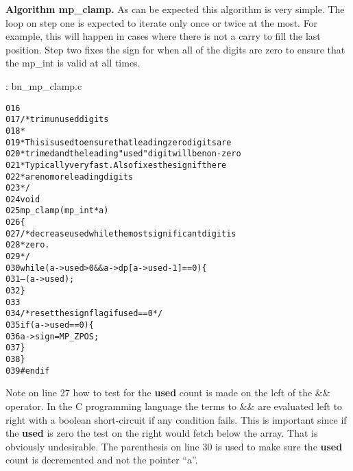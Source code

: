 \documentclass[b5paper]{book}
\begin{document}
\textbf{Algorithm mp\_clamp.}
As can be expected this algorithm is very simple.  The loop on step one is expected to iterate only once or twice at
the most.  For example, this will happen in cases where there is not a carry to fill the last position.  Step two fixes the sign for 
when all of the digits are zero to ensure that the mp\_int is valid at all times.

\vspace{+3mm}\begin{small}
\hspace{-5.1mm}{\bf File}: bn\_mp\_clamp.c
\vspace{-3mm}
\begin{alltt}
016   
017   /* trim unused digits 
018    *
019    * This is used to ensure that leading zero digits are
020    * trimed and the leading "used" digit will be non-zero
021    * Typically very fast.  Also fixes the sign if there
022    * are no more leading digits
023    */
024   void
025   mp_clamp (mp_int * a)
026   \{
027     /* decrease used while the most significant digit is
028      * zero.
029      */
030     while (a->used > 0 && a->dp[a->used - 1] == 0) \{
031       --(a->used);
032     \}
033   
034     /* reset the sign flag if used == 0 */
035     if (a->used == 0) \{
036       a->sign = MP_ZPOS;
037     \}
038   \}
039   #endif
\end{alltt}
\end{small}

Note on line 27 how to test for the \textbf{used} count is made on the left of the \&\& operator.  In the C programming
language the terms to \&\& are evaluated left to right with a boolean short-circuit if any condition fails.  This is 
important since if the \textbf{used} is zero the test on the right would fetch below the array.  That is obviously 
undesirable.  The parenthesis on line 30 is used to make sure the \textbf{used} count is decremented and not
the pointer ``a''.  
\end{document}
